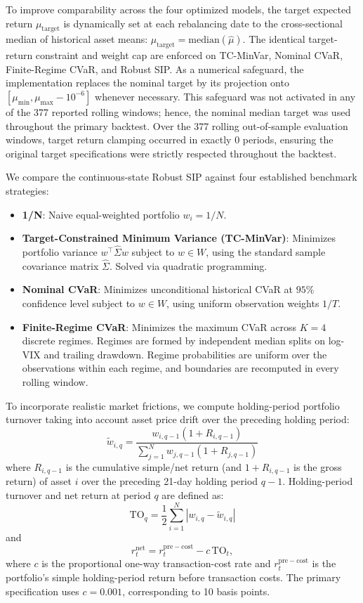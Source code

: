 \documentclass[smallextended]{svjour3}
\begin{document}
To improve comparability across the four optimized models, the target expected return $\mu_{\text{target}}$ is dynamically set at each rebalancing date to the cross-sectional median of historical asset means: $\mu_{\text{target}} = \text{median}(\hat{\mu})$. The identical target-return constraint and weight cap are enforced on TC-MinVar, Nominal CVaR, Finite-Regime CVaR, and Robust SIP. As a numerical safeguard, the implementation replaces the nominal target
by its projection onto
$[\mu_{\min},\mu_{\max}-10^{-6}]$ whenever necessary. This safeguard was
not activated in any of the 377 reported rolling windows; hence, the
nominal median target was used throughout the primary backtest. Over the 377 rolling out-of-sample evaluation windows, target return clamping occurred in exactly 0 periods, ensuring the original target specifications were strictly respected throughout the backtest.

We compare the continuous-state Robust SIP against four established benchmark strategies:
\begin{itemize}
    \item \textbf{1/N}: Naive equal-weighted portfolio $w_i = 1/N$.
    \item \textbf{Target-Constrained Minimum Variance (TC-MinVar)}: Minimizes portfolio variance $w^\top \widehat{\Sigma} w$ subject to $w \in W$, using the standard sample covariance matrix $\widehat{\Sigma}$. Solved via quadratic programming.
    \item \textbf{Nominal CVaR}: Minimizes unconditional historical CVaR at $95\%$ confidence level subject to $w \in W$, using uniform observation weights $1/T$.
    \item \textbf{Finite-Regime CVaR}: Minimizes the maximum CVaR across $K=4$ discrete regimes. Regimes are formed by independent median splits on log-VIX and trailing drawdown. Regime probabilities are uniform over the observations within each regime, and boundaries are recomputed in every rolling window.
\end{itemize}

To incorporate realistic market frictions, we compute holding-period portfolio turnover taking into account asset price drift over the preceding holding period:
\begin{equation}
    \widetilde w_{i,q} = \frac{w_{i,q-1}(1+R_{i,q-1})}{\sum_{j=1}^N w_{j,q-1}(1+R_{j,q-1})}
\end{equation}
where $R_{i,q-1}$ is the cumulative simple/net return (and $1+R_{i,q-1}$ is the gross return) of asset $i$ over the preceding 21-day holding period $q-1$. Holding-period turnover and net return at period $q$ are defined as:
\begin{equation}
    \text{TO}_q = \frac{1}{2} \sum_{i=1}^N | w_{i,q} - \widetilde w_{i,q} |
\end{equation}
and
\begin{equation}
    r_t^{\mathrm{net}} = r_t^{\mathrm{pre-cost}} - c\,\mathrm{TO}_t,
\end{equation}
where $c$ is the proportional one-way transaction-cost rate and
$r_t^{\mathrm{pre-cost}}$ is the portfolio's simple holding-period return
before transaction costs. The primary specification uses
$c=0.001$, corresponding to 10 basis points.
\end{document}
